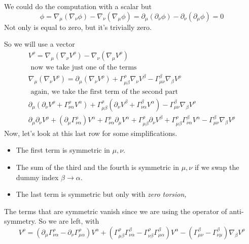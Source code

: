 We could do the computation with a scalar but
\begin{equation}
	[\nabla _{\mu }, \nabla _{\nu }] \phi = \nabla _{\mu}\left( \nabla _{\nu }\phi  \right) -\nabla _{\nu }\left( \nabla _{\mu }\phi  \right) = \partial_{\mu }\left( \partial_{\nu }\phi  \right) - \partial_{\nu }\left( \partial_{\mu }\phi  \right) = 0
\end{equation}
Not only is equal to zero, but it's trivially zero.\par
So we will use a vector
\begin{gather*}
	[\nabla _{\mu },\nabla _{\nu }] V^{\rho } = \nabla _{\mu }\left( \nabla _{\nu }V^{\rho } \right) - \nabla_{\nu }\left( \nabla _{\mu }V^{\rho } \right)	 \\
	\text{ now we take just one of the terms } \\
	\nabla _{\mu }\left( \nabla _{\nu } V^{\rho } \right) = \partial_{\mu } \left( \nabla _{\nu } V^{\rho } \right) + \Gamma ^{\rho }_{\mu \beta } \nabla _{\nu }V^{\beta } - \Gamma ^{\beta }_{\mu \nu } \nabla _{\beta } V^{\rho } \\
	\text{ again, we take the first term of the second part } \\
	\partial_{\mu }\left( \partial_{\nu }V^{\rho } + \Gamma ^{\rho }_{\nu \alpha } V^{\alpha } \right) + \Gamma ^{\rho }_{\mu \beta } \left( \partial_{\nu }V^{\beta } + \Gamma ^{\beta}_{\nu \alpha } V^{\alpha } \right) - \Gamma ^{\beta }_{\mu \nu } \nabla _{\beta }V^{\rho } \\
	\partial_{\mu }\partial_{\nu }V^{\rho } + \left( \partial_{\mu } \Gamma ^{\rho }_{\nu \alpha } \right)V^{\alpha } + \Gamma ^{\rho }_{\nu \alpha } \partial_{\mu }V^{\alpha } + \Gamma ^{\rho }_{\mu \beta } \partial_{\nu }V^{\beta } + \Gamma ^{\rho }_{\mu \beta }\Gamma ^{\beta }_{\nu \alpha } V^{\alpha }- \Gamma ^{\beta }_{\mu \nu }\nabla _{\beta} V^{\rho }
\end{gather*}
Now, let's look at this last row for some simplifications.
\begin{itemize}
\item The first term is symmetric in $\mu , \nu $.
\item The sum of the third and the fourth is symmetric in $\mu , \nu $ if we swap the dummy index $\beta \to \alpha $.
\item The last term is symmetric but only with \emph{zero torsion,}
\end{itemize}
The terms that are symmetric vanish since we are using the operator of anti-symmetry. So we are left, with
\begin{equation}
	[\nabla _{\mu }, \nabla _{\nu }]V^{\rho } = \left( \partial_{\mu }\Gamma ^{\rho }_{\nu \alpha } - \partial_{\nu }\Gamma ^{\rho }_{\mu \alpha } \right)V^{\alpha } + \left( \Gamma ^{\rho }_{\mu \beta } \Gamma ^{\beta }_{\nu \alpha } - \Gamma ^{\rho }_{\nu \beta }\Gamma ^{\beta }_{\mu \alpha } \right)V^{\alpha } - \left( \Gamma ^{\beta }_{\mu \nu } - \Gamma ^{\beta }_{\nu \mu } \right)\nabla _{\beta }V^{\rho }
\end{equation}
